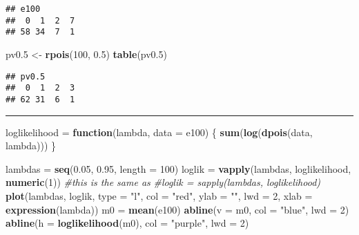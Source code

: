 \documentclass[]{article}
\newenvironment{Shaded}{\begin{snugshade}}{\end{snugshade}}
\newcommand{\KeywordTok}[1]{\textcolor[rgb]{0.13,0.29,0.53}{\textbf{#1}}}
\newcommand{\DataTypeTok}[1]{\textcolor[rgb]{0.13,0.29,0.53}{#1}}
\newcommand{\DecValTok}[1]{\textcolor[rgb]{0.00,0.00,0.81}{#1}}
\newcommand{\FloatTok}[1]{\textcolor[rgb]{0.00,0.00,0.81}{#1}}
\newcommand{\StringTok}[1]{\textcolor[rgb]{0.31,0.60,0.02}{#1}}
\newcommand{\CommentTok}[1]{\textcolor[rgb]{0.56,0.35,0.01}{\textit{#1}}}
\newcommand{\ControlFlowTok}[1]{\textcolor[rgb]{0.13,0.29,0.53}{\textbf{#1}}}
\newcommand{\NormalTok}[1]{#1}
\begin{document}
\begin{verbatim}
## e100
##  0  1  2  7 
## 58 34  7  1
\end{verbatim}

\begin{Shaded}
\begin{Highlighting}[]
\NormalTok{pv0.}\DecValTok{5}\NormalTok{ <-}\StringTok{ }\KeywordTok{rpois}\NormalTok{(}\DecValTok{100}\NormalTok{, }\FloatTok{0.5}\NormalTok{)}
\KeywordTok{table}\NormalTok{(pv0.}\DecValTok{5}\NormalTok{)}
\end{Highlighting}
\end{Shaded}

\begin{verbatim}
## pv0.5
##  0  1  2  3 
## 62 31  6  1
\end{verbatim}

\begin{center}\rule{0.5\linewidth}{\linethickness}\end{center}

\begin{Shaded}
\begin{Highlighting}[]
\NormalTok{loglikelihood  =}\StringTok{  }\ControlFlowTok{function}\NormalTok{(lambda, }\DataTypeTok{data =}\NormalTok{ e100) \{}
  \KeywordTok{sum}\NormalTok{(}\KeywordTok{log}\NormalTok{(}\KeywordTok{dpois}\NormalTok{(data, lambda)))}
\NormalTok{\}}
\end{Highlighting}
\end{Shaded}

\begin{Shaded}
\begin{Highlighting}[]
\NormalTok{lambdas =}\StringTok{ }\KeywordTok{seq}\NormalTok{(}\FloatTok{0.05}\NormalTok{, }\FloatTok{0.95}\NormalTok{, }\DataTypeTok{length =} \DecValTok{100}\NormalTok{)}
\NormalTok{loglik =}\StringTok{ }\KeywordTok{vapply}\NormalTok{(lambdas, loglikelihood, }\KeywordTok{numeric}\NormalTok{(}\DecValTok{1}\NormalTok{))}
\CommentTok{#this is the same as}
\CommentTok{#loglik = sapply(lambdas, loglikelihood)}
\KeywordTok{plot}\NormalTok{(lambdas, loglik, }\DataTypeTok{type =} \StringTok{"l"}\NormalTok{, }\DataTypeTok{col =} \StringTok{"red"}\NormalTok{, }\DataTypeTok{ylab =} \StringTok{""}\NormalTok{, }\DataTypeTok{lwd =} \DecValTok{2}\NormalTok{,}
     \DataTypeTok{xlab =} \KeywordTok{expression}\NormalTok{(lambda))}
\NormalTok{m0 =}\StringTok{ }\KeywordTok{mean}\NormalTok{(e100)}
\KeywordTok{abline}\NormalTok{(}\DataTypeTok{v =}\NormalTok{ m0, }\DataTypeTok{col =} \StringTok{"blue"}\NormalTok{, }\DataTypeTok{lwd =} \DecValTok{2}\NormalTok{)}
\KeywordTok{abline}\NormalTok{(}\DataTypeTok{h =} \KeywordTok{loglikelihood}\NormalTok{(m0), }\DataTypeTok{col =} \StringTok{"purple"}\NormalTok{, }\DataTypeTok{lwd =} \DecValTok{2}\NormalTok{)}
\end{Highlighting}
\end{Shaded}
\end{document}
